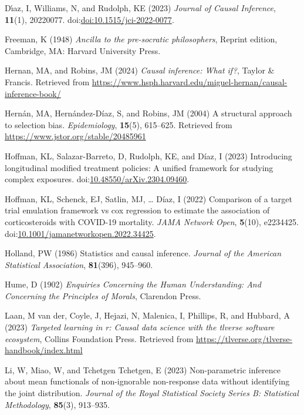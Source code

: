 \documentclass[
  single column]{article}
\newlength{\cslhangindent}
\newenvironment{CSLReferences}[2] %
 {\begin{list}{}{%
  \setlength{\itemindent}{0pt}
  \setlength{\leftmargin}{0pt}
  \setlength{\parsep}{0pt}
  \ifodd #1
   \setlength{\leftmargin}{\cslhangindent}
   \setlength{\itemindent}{-1\cslhangindent}
  \fi
  \setlength{\itemsep}{#2\baselineskip}}}
 {\end{list}}
\begin{document}
\begin{CSLReferences}{1}{0}
Dı́az, I, Williams, N, and Rudolph, KE (2023) \emph{Journal of Causal
Inference}, \textbf{11}(1), 20220077.
doi:\href{https://doi.org/doi:10.1515/jci-2022-0077}{doi:10.1515/jci-2022-0077}.

Freeman, K (1948) \emph{Ancilla to the pre-socratic philosophers},
Reprint edition, Cambridge, MA: Harvard University Press.

Hernan, MA, and Robins, JM (2024) \emph{Causal inference: What if?},
Taylor \& Francis. Retrieved from
\url{https://www.hsph.harvard.edu/miguel-hernan/causal-inference-book/}

Hernán, MA, Hernández-Díaz, S, and Robins, JM (2004) A structural
approach to selection bias. \emph{Epidemiology}, \textbf{15}(5),
615--625. Retrieved from \url{https://www.jstor.org/stable/20485961}

Hoffman, KL, Salazar-Barreto, D, Rudolph, KE, and Díaz, I (2023)
Introducing longitudinal modified treatment policies: A unified
framework for studying complex exposures.
doi:\href{https://doi.org/10.48550/arXiv.2304.09460}{10.48550/arXiv.2304.09460}.

Hoffman, KL, Schenck, EJ, Satlin, MJ, \ldots{} Díaz, I (2022) Comparison
of a target trial emulation framework vs cox regression to estimate the
association of corticosteroids with COVID-19 mortality. \emph{JAMA
Network Open}, \textbf{5}(10), e2234425.
doi:\href{https://doi.org/10.1001/jamanetworkopen.2022.34425}{10.1001/jamanetworkopen.2022.34425}.

Holland, PW (1986) Statistics and causal inference. \emph{Journal of the
American Statistical Association}, \textbf{81}(396), 945--960.

Hume, D (1902) \emph{Enquiries Concerning the Human Understanding: And
Concerning the Principles of Morals}, Clarendon Press.

Laan, M van der, Coyle, J, Hejazi, N, Malenica, I, Phillips, R, and
Hubbard, A (2023) \emph{Targeted learning in r: Causal data science with
the tlverse software ecosystem}, Collins Foundation Press. Retrieved
from \url{https://tlverse.org/tlverse-handbook/index.html}

Li, W, Miao, W, and Tchetgen Tchetgen, E (2023) Non-parametric inference
about mean functionals of non-ignorable non-response data without
identifying the joint distribution. \emph{Journal of the Royal
Statistical Society Series B: Statistical Methodology}, \textbf{85}(3),
913--935.


\end{CSLReferences}
\end{document}
